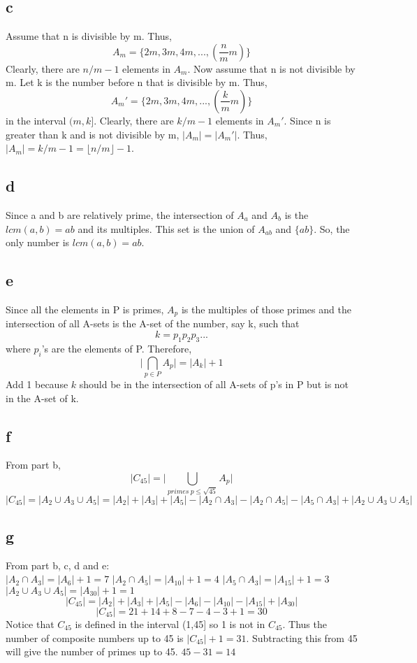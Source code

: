 \documentclass[12pt]{article}
\begin{document}
\subsection*{c}
Assume that n is divisible by m. Thus,
$$A_m=\{2m,3m,4m,...,(\frac{n}{m}m)\}$$
Clearly, there are $n/m-1$ elements in $A_m$. Now assume that n is not divisible by m. Let k is the number before n that is divisible by m. Thus,
$$A_m'=\{2m,3m,4m,...,(\frac{k}{m}m)\}$$
in the interval $(m,k]$.
Clearly, there are $k/m-1$ elements in $A_m'$. Since n is greater than k and is not divisible by m, $|A_m|=|A_m'|$. Thus, $|A_m|=k/m-1=\lfloor n/m \rfloor -1$.
\subsection*{d}
Since a and b are relatively prime, the intersection of $A_a$ and $A_b$ is the $lcm(a,b)=ab$ and its multiples. This set is the union of $A_{ab}$ and $\{ab\}$. So, the only number is $lcm(a,b)=ab$.
\subsection*{e}
Since all the elements in P is primes, $A_p$ is the multiples of those primes and the intersection of all A-sets is the A-set of the number, say k, such that
$$k=p_1p_2p_3...$$ 
where $p_i$'s are the elements of P. Therefore,
$$\bigg |\bigcap_{p \in P}A_p\bigg |=|A_k|+1$$
Add 1 because $k$ should be in the intersection of all A-sets of p's in P but  is not in the A-set of k.
\subsection*{f}
From part b,
$$|C_{45}|=\bigg|\bigcup_{primes\ p\leq \sqrt{45}}A_p\bigg|$$
$$|C_{45}|=|A_2\cup A_3\cup A_5|=|A_2|+|A_3|+|A_5|-|A_2\cap A_3|-|A_2\cap A_5|-|A_5\cap A_3|+|A_2\cup A_3\cup A_5|$$
\subsection*{g}
From part b, c, d and e: \\
$|A_2\cap A_3|=|A_6|+1=7$
$|A_2\cap A_5|=|A_{10}|+1=4$
$|A_5\cap A_3|=|A_{15}|+1=3$
$|A_2\cup A_3\cup A_5|=|A_{30}|+1=1$
$$|C_{45}|=|A_2|+|A_3|+|A_5|-|A_6|-|A_{10}|-|A_{15}|+|A_{30}|$$
$$|C_{45}|=21+14+8-7-4-3+1=30$$
Notice that $C_{45}$ is defined in the interval (1,45] so 1 is not in $C_{45}$. Thus the number of composite numbers up to 45 is $|C_{45}|+1=31$. Subtracting this from 45 will give the number of primes up to 45.
$45-31=14$
\end{document}
